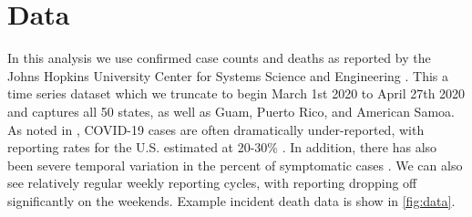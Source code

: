 \documentclass[11pt]{amsart}
\begin{document}
%
%

\section{Data}
	In this analysis we use confirmed case counts and deaths as reported by the Johns Hopkins University Center for Systems Science and Engineering \cite{dong2020interactive}. This a time series dataset which we truncate to begin March 1st 2020 to April 27th 2020 and captures all 50 states, as well as Guam, Puerto Rico, and American Samoa. As noted in \cite{krantz2020level}, COVID-19 cases are often dramatically under-reported, with reporting rates for the U.S. estimated at 20-30\% \cite{russel2020using}. In addition, there has also been severe temporal variation in the percent of symptomatic cases  \cite{russel2020using}. We can also see relatively regular weekly reporting cycles, with reporting dropping off significantly on the weekends. Example incident death data is show in \ref{fig:data}.
	
\end{document}
